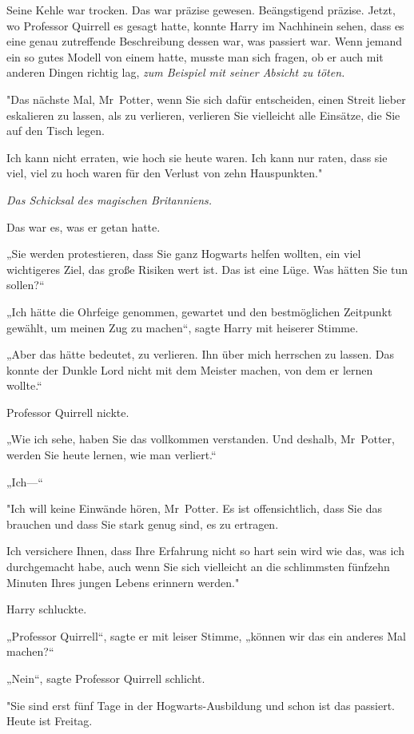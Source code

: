 {Seine Kehle war trocken. Das war präzise gewesen. Beängstigend präzise. Jetzt, wo Professor Quirrell es gesagt hatte, konnte Harry im Nachhinein sehen, dass es eine genau zutreffende Beschreibung dessen war, was passiert war. Wenn jemand ein so gutes Modell von einem hatte, musste man sich fragen, ob er auch mit anderen Dingen richtig lag, \emph{zum Beispiel mit seiner Absicht zu töten.}

"Das nächste Mal, Mr~Potter, wenn Sie sich dafür entscheiden, einen Streit lieber eskalieren zu lassen, als zu verlieren, verlieren Sie vielleicht alle Einsätze, die Sie auf den Tisch legen.

Ich kann nicht erraten, wie hoch sie heute waren. Ich kann nur raten, dass sie viel, viel zu hoch waren für den Verlust von zehn Hauspunkten."

\emph{Das Schicksal des magischen Britanniens.}

Das war es, was er getan hatte.

„Sie werden protestieren, dass Sie ganz Hogwarts helfen wollten, ein viel wichtigeres Ziel, das große Risiken wert ist. Das ist eine Lüge. Was hätten Sie tun sollen?“

„Ich hätte die Ohrfeige genommen, gewartet und den bestmöglichen Zeitpunkt gewählt, um meinen Zug zu machen“, sagte Harry mit heiserer Stimme.

„Aber das hätte bedeutet, zu verlieren. Ihn über mich herrschen zu lassen. Das konnte der Dunkle Lord nicht mit dem Meister machen, von dem er lernen wollte.“

Professor Quirrell nickte.

„Wie ich sehe, haben Sie das vollkommen verstanden. Und deshalb, Mr~Potter, werden Sie heute lernen, wie man verliert.“

„Ich—“

"Ich will keine Einwände hören, Mr~Potter. Es ist offensichtlich, dass Sie das brauchen und dass Sie stark genug sind, es zu ertragen.

Ich versichere Ihnen, dass Ihre Erfahrung nicht so hart sein wird wie das, was ich durchgemacht habe, auch wenn Sie sich vielleicht an die schlimmsten fünfzehn Minuten Ihres jungen Lebens erinnern werden."

Harry schluckte.

„Professor Quirrell“, sagte er mit leiser Stimme, „können wir das ein anderes Mal machen?“

„Nein“, sagte Professor Quirrell schlicht.

"Sie sind erst fünf Tage in der Hogwarts-Ausbildung und schon ist das passiert. Heute ist Freitag.

}
